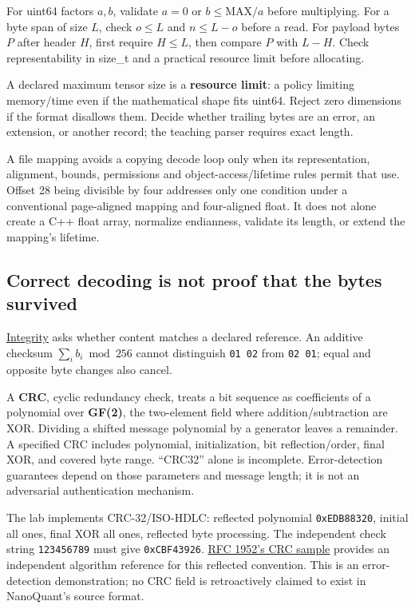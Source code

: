 For uint64 factors \(a,b\), validate \(a=0\) or \(b\le\mathrm{MAX}/a\) before multiplying. For a byte span of size \(L\), check \(o\le L\) and \(n\le L-o\) before a read. For payload bytes \(P\) after header \(H\), first require \(H\le L\), then compare \(P\) with \(L-H\). Check representability in size\_t and a practical resource limit before allocating.

A declared maximum tensor size is a \textbf{resource limit}: a policy limiting memory/time even if the mathematical shape fits uint64. Reject zero dimensions if the format disallows them. Decide whether trailing bytes are an error, an extension, or another record; the teaching parser requires exact length.

A file mapping avoids a copying decode loop only when its representation, alignment, bounds, permissions and object-access/lifetime rules permit that use. Offset 28 being divisible by four addresses only one condition under a conventional page-aligned mapping and four-aligned float. It does not alone create a C++ float array, normalize endianness, validate its length, or extend the mapping's lifetime.

\subsection{Correct decoding is not proof that the bytes survived}\label{01-foundations-i-ch002-correct-decoding-is-not-proof-that-the-bytes-survived}

\hyperref[appendix-ed338677de0a]{Integrity} asks whether content matches a declared reference. An additive checksum \(\sum_i b_i\bmod256\) cannot distinguish \texttt{01\ 02} from \texttt{02\ 01}; equal and opposite byte changes also cancel.

A \textbf{CRC}, cyclic redundancy check, treats a bit sequence as coefficients of a polynomial over \textbf{GF(2)}, the two-element field where addition/subtraction are XOR. Dividing a shifted message polynomial by a generator leaves a remainder. A specified CRC includes polynomial, initialization, bit reflection/order, final XOR, and covered byte range. ``CRC32'' alone is incomplete. Error-detection guarantees depend on those parameters and message length; it is not an adversarial authentication mechanism.

The lab implements CRC-32/ISO-HDLC: reflected polynomial \texttt{0xEDB88320}, initial all ones, final XOR all ones, reflected byte processing. The independent check string \texttt{123456789} must give \texttt{0xCBF43926}. \href{https://www.rfc-editor.org/rfc/rfc1952\#section-8}{RFC 1952's CRC sample} provides an independent algorithm reference for this reflected convention. This is an error-detection demonstration; no CRC field is retroactively claimed to exist in NanoQuant's source format.

